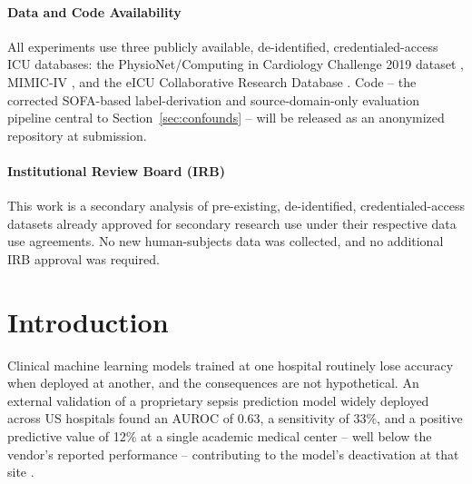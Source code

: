 \documentclass[pmlr,twocolumn,10pt]{jmlr} %
\begin{document}
\paragraph*{Data and Code Availability}
All experiments use three publicly available, de-identified,
credentialed-access ICU databases: the PhysioNet/Computing in Cardiology
Challenge 2019 dataset \citep{reyna2020early}, MIMIC-IV
\citep{johnson2023mimiciv}, and the eICU Collaborative Research Database
\citep{pollard2018eicu}. Code -- the corrected SOFA-based label-derivation
and source-domain-only evaluation pipeline central to
Section~\ref{sec:confounds} -- will be released as an anonymized
repository at submission.

\paragraph*{Institutional Review Board (IRB)}
This work is a secondary analysis of pre-existing, de-identified,
credentialed-access datasets already approved for secondary research use
under their respective data use agreements. No new human-subjects data was
collected, and no additional IRB approval was required.
\fi

\section{Introduction}
\label{sec:intro}

Clinical machine learning models trained at one hospital routinely lose
accuracy when deployed at another, and the consequences are not
hypothetical. An external validation of a proprietary sepsis prediction
model widely deployed across US hospitals found an AUROC of 0.63, a
sensitivity of 33\%, and a positive predictive value of 12\% at a single
academic medical center -- well below the vendor's reported performance --
contributing to the model's deactivation at that site
\citep{wong2021external}.
\end{document}
